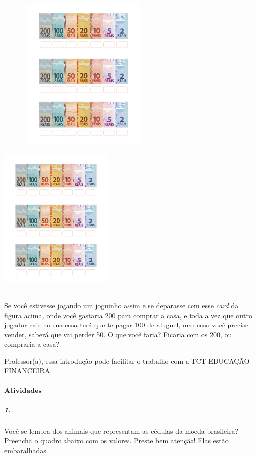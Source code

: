 \includegraphics[width=3.33025in,height=2.95560in]{media/image68.png}\includegraphics[width=2.16667in,height=3.03125in]{media/image69.png}

Se você estivesse jogando um joguinho assim e se deparasse com esse
\emph{card} da figura acima\emph{,} onde você gastaria 200 para comprar
a casa, e toda a vez que outro jogador cair na sua casa terá que te
pagar 100 de aluguel, mas caso você precise vender, saberá que vai
perder 50. O que você faria? Ficaria com os 200, ou compraria a casa?

Professor(a), essa introdução pode facilitar o trabalho com a
TCT-EDUCAÇÃO FINANCEIRA.

\paragraph{Atividades }\label{atividades-4}

\subparagraph{1.}\label{section-57}

Você se lembra dos animais que representam as cédulas da moeda
brasileira? Preencha o quadro abaixo com os valores. Preste bem atenção!
Elas estão embaralhadas.

